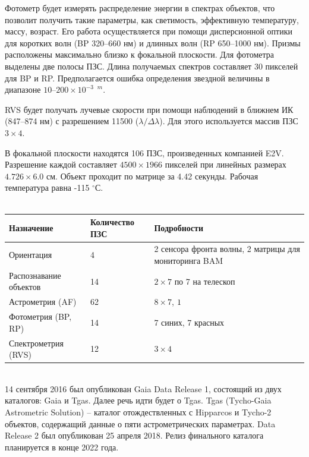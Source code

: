 \documentclass[14pt]{article} %
\begin{document}
Фотометр будет измерять распределение энергии в спектрах объектов, что позволит получить такие параметры, как светимость, эффективную температуру, массу, возраст. Его работа осуществляется при помощи дисперсионной оптики для коротких волн (BP 320--660 нм) и длинных волн (RP 650--1000 нм). Призмы расположены максимально близко к фокальной плоскости. Для фотометра выделены две полосы ПЗС. Длина получаемых спектров составляет 30 пикселей для BP и RP. Предполагается ошибка определения звездной величины в диапазоне $10\mbox{--}200\times10^{-3\mbox{ }m}$.

RVS будет получать лучевые скорости при помощи наблюдений в ближнем ИК (847--874 нм) с разрешением 11500 ($\lambda/\Delta\lambda$). Для этого используется массив ПЗС $3\times4$.

В фокальной плоскости находятся 106 ПЗС, произведенных компанией E2V. Разрешение каждой составляет $4500\times1966$ пикселей при линейных размерах $4.726\times6.0$ см. Объект проходит по матрице за 4.42 секунды. Рабочая температура равна -115 $^\circ$С.
\\\\
\begin{tabular}{|p{3.5cm}|p{2.5cm}|p{8cm}|}
\hline
Назначение&Количество ПЗС&Подробности\\
\hline
Ориентация &4 & 2 сенсора фронта волны, 2 матрицы для мониторинга BAM\\
\hline
Распознавание объектов &14&$2\times7$ по 7 на телескоп\\
\hline
Астрометрия (AF) & 62 & $8\times7$, $1\time6$\\
\hline
Фотометрия (BP, RP) & 14 & 7 синих, 7 красных\\
\hline
Спектрометрия (RVS) & 12& $3\times4$\\
\hline
\end{tabular}\\

14 сентября 2016 был опубликован Gaia Data Release 1, состоящий из двух каталогов: Gaia и Tgas. Далее речь идти будет о Tgas. Tgas (Tycho-Gaia Astrometric Solution) -- каталог отождествленных с Hipparcos и Tycho-2 объектов, содержащий данные о пяти астрометрических параметрах. Data Release 2 был опубликован 25 апреля 2018. Релиз финального каталога планируется в конце 2022 года.
\end{document}
